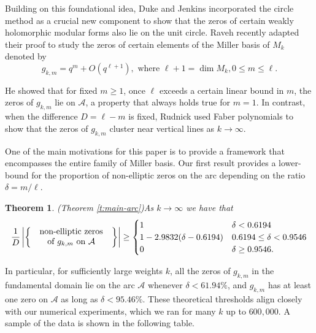 \documentclass[12pt]{amsart}
\theoremstyle{plain} %
\newtheorem{theoremletter}{Theorem}
\theoremstyle{definition}
\theoremstyle{remark}
\numberwithin{equation}{section}
\begin{document}
Building on this foundational idea, Duke and Jenkins \cite{duke-jenkins} incorporated the circle method as a crucial new component to show that the zeros of certain weakly holomorphic modular forms also lie on the unit circle. Raveh \cite{raveh:miller} recently adapted their proof to study the zeros of certain elements of the Miller basis of $M_k$ denoted by 
\begin{equation}\label{def-Miller-basis}
g_{k,m}=q^m+O\left( q^{\ell +1} \right),\text{ where } \ell+1=\dim M_k, 0\le m\le \ell.
\end{equation}

He showed that for fixed $m\ge 1$, once $\ell$ exceeds a certain linear bound in $m$, the zeros of $g_{k,m}$
lie on $\mathcal{A}$, a property that always holds true for $m=1$. In contrast, when the difference $D=\ell-m$ is fixed, Rudnick \cite{rudnick:faber} used Faber polynomials to show that the zeros of $g_{k,m}$ cluster near vertical lines as $k\to \infty$. 

One of the main motivations for this paper is to provide a framework that encompasses the entire family of Miller basis. Our first result provides a lower-bound for the proportion of non-elliptic zeros on the arc depending on the ratio $\delta=m/\ell$. 

\begin{theoremletter}(Theorem \ref{t:main-arc})\label{tl:main-arc}
As $k\to \infty$ we have that
\[\frac{1}{D}
\left|
\left\{
\parbox{3.3cm}{
\centering
non-elliptic zeros\\
of $g_{k,m}$ on $\mathcal{A}$
}
\right\}
\right|\geq \begin{cases}1&\delta<0.6194\\ 1-2.9832(\delta-0.6194)& 0.6194\leq \delta<0.9546\\ 0&\delta\geq 0.9546.\end{cases}\]

\end{theoremletter}

In particular, for sufficiently large weights $k$, all the zeros of $g_{k,m}$ in the fundamental domain lie on the arc $\mathcal{A}$ whenever $\delta<61.94\%$, and $g_{k,m}$ has 
at least one zero on $\mathcal{A}$ as long as $\delta<95.46\%$. These theoretical thresholds align closely with our numerical experiments, which we ran for many $k$ up to $600,000$. A sample of the data is shown in the following table.
\end{document}

